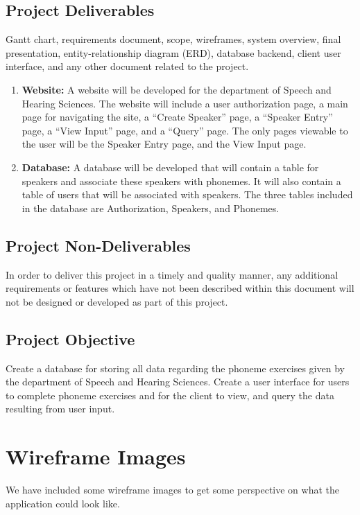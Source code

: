 \documentclass[12pt, a4paper, oneside]{article}
\begin{document}
\subsection*{Project Deliverables}
Gantt chart, requirements document, scope, wireframes, system overview, final presentation, entity-relationship diagram (ERD), database backend, client user interface, and any other document related to the project. 
\begin{enumerate}
\item \textbf{Website:} A website will be developed for the department of Speech and Hearing Sciences. The website will include a user authorization page, a main page for navigating the site, a “Create Speaker” page, a “Speaker Entry” page, a “View Input” page, and a “Query” page. The only pages viewable to the user will be the Speaker Entry page, and the View Input page.

\item \textbf{Database:} A database will be developed that will contain a table for speakers and associate these speakers with phonemes. It will also contain a table of users that will be associated with speakers. The three tables included in the database are Authorization, Speakers, and Phonemes.
\end{enumerate}

\subsection*{Project Non-Deliverables}
In order to deliver this project in a timely and quality manner, any additional requirements or features which have not been described within this document will not be designed or developed as part of this project. 

\subsection*{Project Objective}
Create a database for storing all data regarding the phoneme exercises given by the department of Speech and Hearing Sciences. Create a user interface for users to complete phoneme exercises and for the client to view, and query the data resulting from user input.

\pagebreak 

\section*{Wireframe Images}
We have included some wireframe images to get some perspective on what the application could look like.
\end{document}
